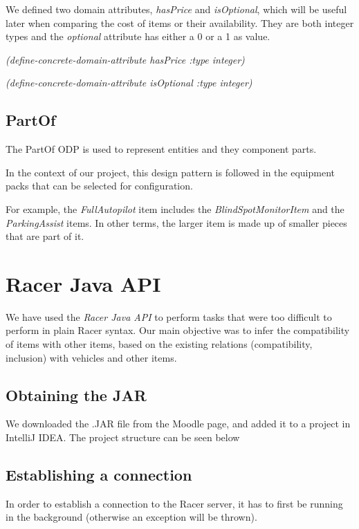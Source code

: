 \documentclass[a4paper,12pt]{report}
\begin{document}
We defined two domain attributes, \textit{hasPrice} and \textit{isOptional}, which will be useful later when comparing the cost of items or their availability. They are both integer types and the \textit{optional} attribute has either a 0 or a 1 as value.

\bigskip
\textit{(define-concrete-domain-attribute hasPrice :type integer)}

\textit{(define-concrete-domain-attribute isOptional :type integer)}

\section{PartOf}
The PartOf ODP is used to represent entities and they component parts.

\begin{center}
\end{center}

In the context of our project, this design pattern is followed in the equipment packs that can be selected for configuration.

For example, the \textit{FullAutopilot} item includes the \textit{BlindSpotMonitorItem} and the \textit{ParkingAssist} items. In other terms, the larger item is made up of smaller pieces that are part of it.

\chapter{Racer Java API}
We have used the \textit{Racer Java API} to perform tasks that were too difficult to perform in plain Racer syntax. Our main objective was to infer the compatibility of items with other items, based on the existing relations (compatibility, inclusion) with vehicles and other items.

\section{Obtaining the JAR}
We downloaded the .JAR file from the Moodle page, and added it to a project in IntelliJ IDEA. The project structure can be seen below

\begin{center}
\end{center}

\section{Establishing a connection}
In order to establish a connection to the Racer server, it has to first be running in the background (otherwise an exception will be thrown). 
\end{document}
